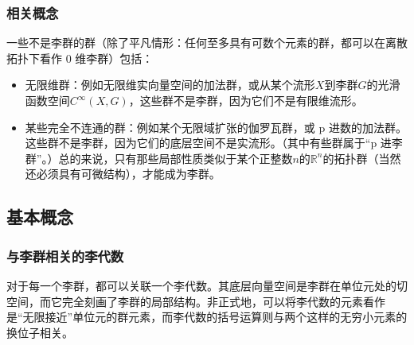 \subsubsection{相关概念}
一些不是李群的群（除了平凡情形：任何至多具有可数个元素的群，都可以在离散拓扑下看作 0 维李群）包括：
\begin{itemize}
\item 无限维群：例如无限维实向量空间的加法群，或从某个流形$X$到李群$G$的光滑函数空间$C^{\infty}(X, G)$，这些群不是李群，因为它们不是有限维流形。
\item 某些完全不连通的群：例如某个无限域扩张的伽罗瓦群，或 p 进数的加法群。这些群不是李群，因为它们的底层空间不是实流形。（其中有些群属于“p 进李群”。）总的来说，只有那些局部性质类似于某个正整数$n$的$\mathbb{R}^n$的拓扑群（当然还必须具有可微结构），才能成为李群。
\end{itemize}
\subsection{基本概念}
\subsubsection{与李群相关的李代数}
对于每一个李群，都可以关联一个李代数。其底层向量空间是李群在单位元处的切空间，而它完全刻画了李群的局部结构。非正式地，可以将李代数的元素看作是“无限接近”单位元的群元素，而李代数的括号运算则与两个这样的无穷小元素的换位子相关。

